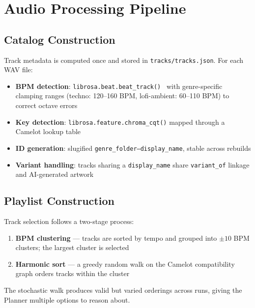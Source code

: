\documentclass[11pt,a4paper]{article}
\begin{document}
\section{Audio Processing Pipeline}

\subsection{Catalog Construction}

Track metadata is computed once and stored in \texttt{tracks/tracks.json}.
For each WAV file:

\begin{itemize}
  \item \textbf{BPM detection}: \texttt{librosa.beat.beat\_track()}~\cite{librosa}
        with genre-specific clamping ranges (techno: 120--160 BPM,
        lofi-ambient: 60--110 BPM) to correct octave errors
  \item \textbf{Key detection}: \texttt{librosa.feature.chroma\_cqt()}
        mapped through a Camelot lookup table
  \item \textbf{ID generation}: slugified
        \texttt{genre\_folder--display\_name}, stable across rebuilds
  \item \textbf{Variant handling}: tracks sharing a \texttt{display\_name}
        share \texttt{variant\_of} linkage and AI-generated artwork
\end{itemize}

\subsection{Playlist Construction}

Track selection follows a two-stage process:

\begin{enumerate}
  \item \textbf{BPM clustering} --- tracks are sorted by tempo and grouped
        into $\pm10$ BPM clusters; the largest cluster is selected
  \item \textbf{Harmonic sort} --- a greedy random walk on the Camelot
        compatibility graph orders tracks within the cluster
\end{enumerate}

The stochastic walk produces valid but varied orderings across runs, giving
the Planner multiple options to reason about.
\end{document}
